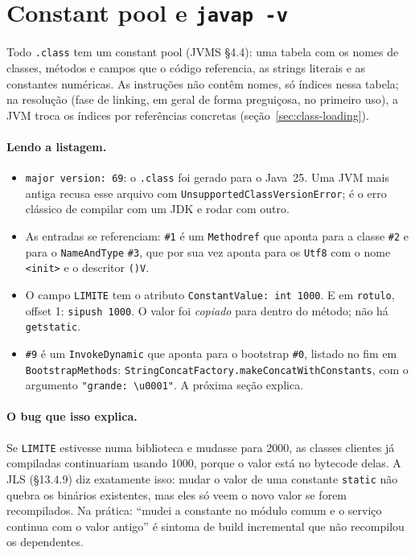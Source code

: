 \section{Constant pool e \texttt{javap -v}}
\label{sec:constant-pool}

Todo \texttt{.class} tem um constant pool (JVMS §4.4): uma tabela com
os nomes de classes, métodos e campos que o código referencia, as
strings literais e as constantes numéricas. As instruções não contêm
nomes, só índices nessa tabela; na resolução (fase de linking, em geral
de forma preguiçosa, no primeiro uso), a JVM troca os índices por
referências concretas (seção~\ref{sec:class-loading}).




\paragraph{Lendo a listagem.}
\begin{itemize}
\item \texttt{major version: 69}: o \texttt{.class} foi gerado para o
  Java~25. Uma JVM mais antiga recusa esse arquivo com
  \texttt{UnsupportedClassVersionError}; é o erro clássico de compilar
  com um JDK e rodar com outro.
\item As entradas se referenciam: \texttt{\#1} é um \texttt{Methodref}
  que aponta para a classe \texttt{\#2} e para o
  \texttt{NameAndType} \texttt{\#3}, que por sua vez aponta para os
  \texttt{Utf8} com o nome \texttt{<init>} e o descritor \texttt{()V}.
\item O campo \texttt{LIMITE} tem o atributo \texttt{ConstantValue: int
  1000}. E em \texttt{rotulo}, offset 1: \texttt{sipush 1000}. O valor
  foi \emph{copiado} para dentro do método; não há \texttt{getstatic}.
\item \texttt{\#9} é um \texttt{InvokeDynamic} que aponta para o
  bootstrap \texttt{\#0}, listado no fim em \texttt{BootstrapMethods}:
  \texttt{StringConcatFactory.makeConcatWithConstants}, com o argumento
  \texttt{"grande: \textbackslash u0001"}. A próxima seção explica.
\end{itemize}

\paragraph{O bug que isso explica.}
Se \texttt{LIMITE} estivesse numa biblioteca e mudasse para 2000, as
classes clientes já compiladas continuariam usando 1000, porque o valor
está no bytecode delas. A JLS (§13.4.9) diz exatamente isso: mudar o
valor de uma constante \texttt{static} não quebra os binários existentes,
mas eles só veem o novo valor se forem recompilados. Na prática:
\enquote{mudei a constante no módulo comum e o serviço continua com o
valor antigo} é sintoma de build incremental que não recompilou os
dependentes.

